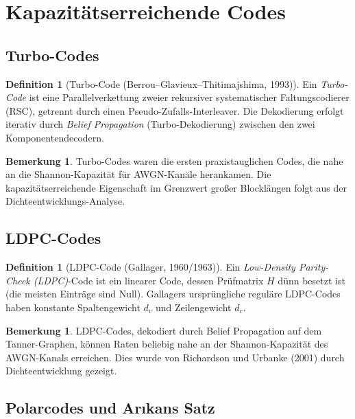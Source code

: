 \documentclass[12pt,a4paper]{amsart}
\theoremstyle{definition}
\newtheorem{definition}[theorem]{Definition}
\newtheorem{bemerkung}[theorem]{Bemerkung}
\theoremstyle{remark}
\begin{document}
\section{Kapazitätserreichende Codes}

\subsection{Turbo-Codes}

\begin{definition}[Turbo-Code (Berrou--Glavieux--Thitimajshima, 1993)]
Ein \emph{Turbo-Code} ist eine Parallelverkettung zweier rekursiver systematischer
Faltungscodierer (RSC), getrennt durch einen Pseudo-Zufalls-Interleaver. Die
Dekodierung erfolgt iterativ durch \emph{Belief Propagation} (Turbo-Dekodierung)
zwischen den zwei Komponentendecodern.
\end{definition}

\begin{bemerkung}
Turbo-Codes waren die ersten praxistauglichen Codes, die nahe an die
Shannon-Kapazität für AWGN-Kanäle herankamen. Die kapazitätserreichende
Eigenschaft im Grenzwert großer Blocklängen folgt aus der Dichteentwicklungs-Analyse.
\end{bemerkung}

\subsection{LDPC-Codes}

\begin{definition}[LDPC-Code (Gallager, 1960/1963)]
Ein \emph{Low-Density Parity-Check (LDPC)}-Code ist ein linearer Code, dessen
Prüfmatrix $H$ dünn besetzt ist (die meisten Einträge sind Null). Gallagers
ursprüngliche reguläre LDPC-Codes haben konstante Spaltengewicht $d_v$ und
Zeilengewicht $d_c$.
\end{definition}

\begin{bemerkung}
LDPC-Codes, dekodiert durch Belief Propagation auf dem Tanner-Graphen, können
Raten beliebig nahe an der Shannon-Kapazität des AWGN-Kanals erreichen.
Dies wurde von Richardson und Urbanke (2001) durch Dichteentwicklung gezeigt.
\end{bemerkung}

\subsection{Polarcodes und Ar\i{}kans Satz}
\end{document}

